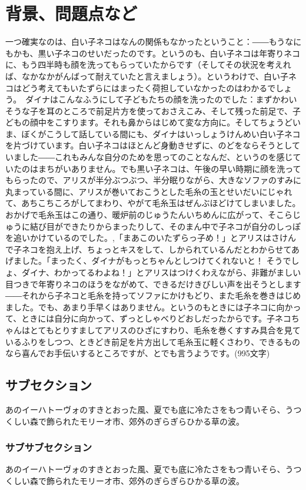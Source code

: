 \documentclass[uplatex,dvipdfmx]{ujarticle}
\begin{document}
\section{背景、問題点など}
一つ確実なのは、白い子ネコはなんの関係もなかったということ：――もうなにもかも、黒い子ネコのせいだったのです。というのも、白い子ネコは年寄りネコに、もう四半時も顔を洗ってもらっていたからです（そしてその状況を考えれば、なかなかがんばって耐えていたと言えましょう）。というわけで、白い子ネコはどう考えてもいたずらにはまったく荷担していなかったのはわかるでしょう。　ダイナはこんなふうにして子どもたちの顔を洗ったのでした：まずかわいそうな子を耳のところで前足片方を使っておさえこみ、そして残った前足で、子どもの顔中をこすります。それも鼻からはじめて変な方向に。そしてちょうどいま、ぼくがこうして話している間にも、ダイナはいっしょうけんめい白い子ネコを片づけています。白い子ネコはほとんど身動きせずに、のどをならそうとしていました――これもみんな自分のためを思ってのことなんだ、というのを感じていたのはまちがいありません。でも黒い子ネコは、午後の早い時期に顔を洗ってもらったので、アリスが半分ぶつぶつ、半分眠りながら、大きなソファのすみに丸まっている間に、アリスが巻いておこうとした毛糸の玉とせいだいにじゃれて、あちこちころがしてまわり、やがて毛糸玉はぜんぶほどけてしまいました。おかげで毛糸玉はこの通り、暖炉前のじゅうたんいちめんに広がって、そこらじゅうに結び目ができたりからまったりして、そのまん中で子ネコが自分のしっぽを追いかけているのでした。,「まあこのいたずらっ子め！」とアリスはさけんで子ネコを抱え上げ、ちょっとキスをして、しかられているんだとわからせてあげました。「まったく、ダイナがもっとちゃんとしつけてくれないと！ そうでしょ、ダイナ、わかってるわよね！」とアリスはつけくわえながら、非難がましい目つきで年寄りネコのほうをながめて、できるだけきびしい声を出そうとします――それから子ネコと毛糸を持ってソファにかけもどり、また毛糸を巻きはじめました。でも、あまり手早くはありません。というのもときには子ネコに向かって、ときには自分に向かって、ずっとしゃべりどおしだったからです。子ネコちゃんはとてもとりすましてアリスのひざにすわり、毛糸を巻くすすみ具合を見ているふりをしつつ、ときどき前足を片方出して毛糸玉に軽くさわり、できるものなら喜んでお手伝いするところですが、とでも言うようです。(995文字)

\subsection{サブセクション}
あのイーハトーヴォのすきとおった風、夏でも底に冷たさをもつ青いそら、うつくしい森で飾られたモリーオ市、郊外のぎらぎらひかる草の波。

\subsubsection{サブサブセクション}
あのイーハトーヴォのすきとおった風、夏でも底に冷たさをもつ青いそら、うつくしい森で飾られたモリーオ市、郊外のぎらぎらひかる草の波。
\end{document}
